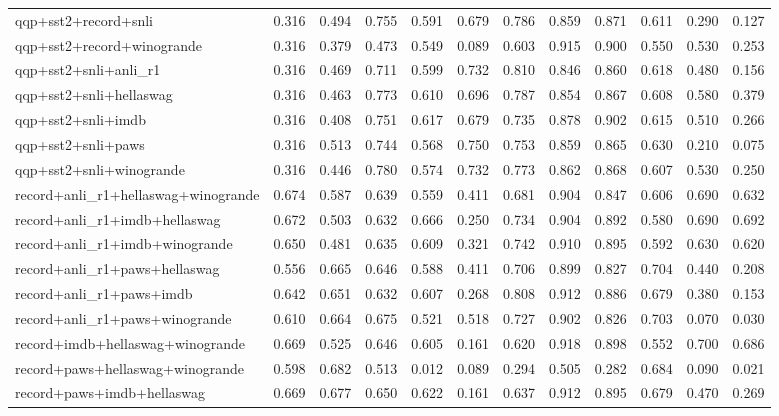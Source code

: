 \begin{table}[t]
\begin{tabular}{lrrrrrrrrrrr}
    qqp+sst2+record+snli & 0.316 & 0.494 & 0.755 & 0.591 & 0.679 & 0.786 & 0.859 & 0.871 & 0.611 & 0.290 & 0.127 \\
    qqp+sst2+record+winogrande & 0.316 & 0.379 & 0.473 & 0.549 & 0.089 & 0.603 & 0.915 & 0.900 & 0.550 & 0.530 & 0.253 \\
    qqp+sst2+snli+anli\_r1 & 0.316 & 0.469 & 0.711 & 0.599 & 0.732 & 0.810 & 0.846 & 0.860 & 0.618 & 0.480 & 0.156 \\
    qqp+sst2+snli+hellaswag & 0.316 & 0.463 & 0.773 & 0.610 & 0.696 & 0.787 & 0.854 & 0.867 & 0.608 & 0.580 & 0.379 \\
    qqp+sst2+snli+imdb & 0.316 & 0.408 & 0.751 & 0.617 & 0.679 & 0.735 & 0.878 & 0.902 & 0.615 & 0.510 & 0.266 \\
    qqp+sst2+snli+paws & 0.316 & 0.513 & 0.744 & 0.568 & 0.750 & 0.753 & 0.859 & 0.865 & 0.630 & 0.210 & 0.075 \\
    qqp+sst2+snli+winogrande & 0.316 & 0.446 & 0.780 & 0.574 & 0.732 & 0.773 & 0.862 & 0.868 & 0.607 & 0.530 & 0.250 \\
    record+anli\_r1+hellaswag+winogrande & 0.674 & 0.587 & 0.639 & 0.559 & 0.411 & 0.681 & 0.904 & 0.847 & 0.606 & 0.690 & 0.632 \\
    record+anli\_r1+imdb+hellaswag & 0.672 & 0.503 & 0.632 & 0.666 & 0.250 & 0.734 & 0.904 & 0.892 & 0.580 & 0.690 & 0.692 \\
    record+anli\_r1+imdb+winogrande & 0.650 & 0.481 & 0.635 & 0.609 & 0.321 & 0.742 & 0.910 & 0.895 & 0.592 & 0.630 & 0.620 \\
    record+anli\_r1+paws+hellaswag & 0.556 & 0.665 & 0.646 & 0.588 & 0.411 & 0.706 & 0.899 & 0.827 & 0.704 & 0.440 & 0.208 \\
    record+anli\_r1+paws+imdb & 0.642 & 0.651 & 0.632 & 0.607 & 0.268 & 0.808 & 0.912 & 0.886 & 0.679 & 0.380 & 0.153 \\
    record+anli\_r1+paws+winogrande & 0.610 & 0.664 & 0.675 & 0.521 & 0.518 & 0.727 & 0.902 & 0.826 & 0.703 & 0.070 & 0.030 \\
    record+imdb+hellaswag+winogrande & 0.669 & 0.525 & 0.646 & 0.605 & 0.161 & 0.620 & 0.918 & 0.898 & 0.552 & 0.700 & 0.686 \\
    record+paws+hellaswag+winogrande & 0.598 & 0.682 & 0.513 & 0.012 & 0.089 & 0.294 & 0.505 & 0.282 & 0.684 & 0.090 & 0.021 \\
    record+paws+imdb+hellaswag & 0.669 & 0.677 & 0.650 & 0.622 & 0.161 & 0.637 & 0.912 & 0.895 & 0.679 & 0.470 & 0.269 \\

\end{tabular}
\end{table}
